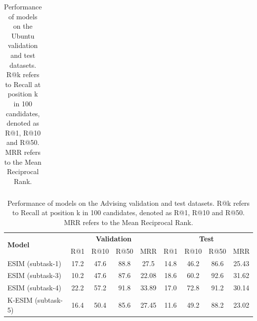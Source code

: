 \documentclass[letterpaper]{article} %
\begin{document}
\begin{table}[htbp!]
\begin{center}
\begin{tabular}{lcccc|cccc}
\end{tabular}
\end{center}
\caption{Performance of models on the Ubuntu validation and test datasets. R@k refers to Recall at position k in 100 candidates, denoted as R@1, R@10 and R@50. MRR refers to the Mean Reciprocal Rank.}
\label{tab:baseline-results-ubuntu}
\end{table}


\begin{table}[h]
\begin{center}
\begin{tabular}{lcccc|cccc}
    \hline
    \multirow{2}{*}{\textbf{Model}} & \multicolumn{4}{c}{\textbf{Validation}} & \multicolumn{4}{c}{\textbf{Test}}\\
     & R@1 & R@10 & R@50 & MRR & R@1 & R@10 & R@50 & MRR  \\ \hline
    ESIM (subtask-1) & 17.2 & 47.6 & 88.8 & 27.5 &  14.8 & 46.2 & 86.6 & 25.43 \\ \hline
    ESIM (subtask-3) & 10.2 & 47.6 & 87.6 & 22.08 &  18.6 & 60.2 & 92.6 & 31.62 \\ \hline
    ESIM (subtask-4) & 22.2 & 57.2 & 91.8 & 33.89 &  17.0 & 72.8 & 91.2 & 30.14 \\ \hline
    K-ESIM (subtask-5) & 16.4 & 50.4 & 85.6 & 27.45 &  11.6 & 49.2 & 88.2 & 23.02 \\ \hline
\end{tabular}
\end{center}
\caption{Performance of models on the Advising validation and test datasets. R@k refers to Recall at position k in 100 candidates, denoted as R@1, R@10 and R@50. MRR refers to the Mean Reciprocal Rank.}
\label{tab:baseline-results-advising}
\end{table}
\end{document}
